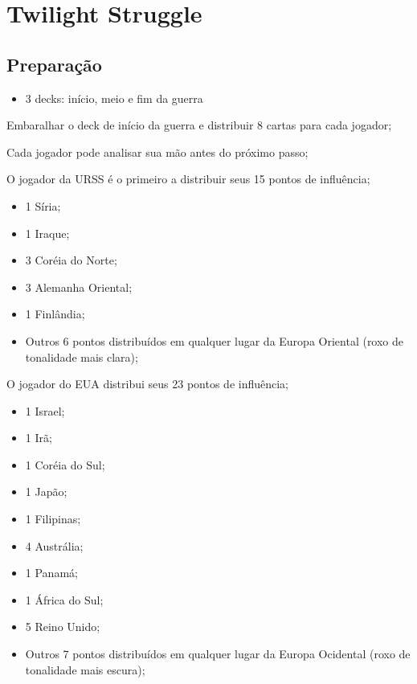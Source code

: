 \documentclass[11pt]{article}
\author{Fabio Favero Henkes}
\date{\today}
\title{}
\begin{document}
\tableofcontents

\section{Twilight Struggle}
\label{sec:orgf3ce3d7}

\subsection{Preparação}
\label{sec:orgfcba38c}

\begin{itemize}
\item 3 decks: início, meio e fim da guerra
\end{itemize}

Embaralhar o deck de início da guerra e distribuir 8 cartas para cada jogador;

Cada jogador pode analisar sua mão antes do próximo passo;

O jogador da URSS é o primeiro a distribuir seus 15 pontos de influência;

\begin{itemize}
\item 1 Síria;
\item 1 Iraque;
\item 3 Coréia do Norte;
\item 3 Alemanha Oriental;
\item 1 Finlândia;
\item Outros 6 pontos distribuídos em qualquer lugar da Europa Oriental (roxo de tonalidade mais clara);
\end{itemize}

O jogador do EUA distribui seus 23 pontos de influência;

\begin{itemize}
\item 1 Israel;
\item 1 Irã;
\item 1 Coréia do Sul;
\item 1 Japão;
\item 1 Filipinas;
\item 4 Austrália;
\item 1 Panamá;
\item 1 África do Sul;
\item 5 Reino Unido;
\item Outros 7 pontos distribuídos em qualquer lugar da Europa Ocidental (roxo de tonalidade mais escura);
\end{itemize}
\end{document}
